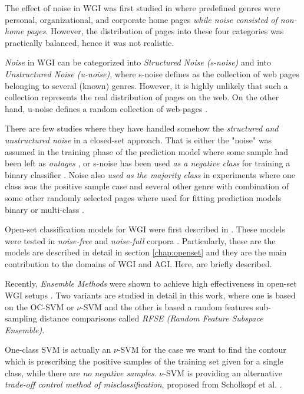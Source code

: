 The effect of noise in WGI  was first studied in \cite{shepherd2004cybergenre,kennedy2005automatic,dong2006binary,levering2008using} where predefined genres were personal, organizational, and corporate home pages \textit{while noise consisted of non-home pages}. However, the distribution of pages into these four categories was practically balanced, hence it was not realistic.

\textit{Noise} in WGI can be categorized into \textit{Structured Noise (s-noise)} and into \textit{Unstructured Noise (u-noise)}, where s-noise defines as the collection of web pages belonging to several (known) genres. However, it is highly unlikely that such a collection  represents the real distribution of pages on the web. On the other hand, u-noise defines a random collection of web-pages \parencite{santini2011cross}.

There are few studies where they have handled somehow the \textit{structured and unstructured noise} in a closed-set approach. That is either the "noise" was assumed in the training phase of the prediction model where some sample had been left as \textit{outages} \parencite{jebari2015combination}, or s-noise has been used \textit{as a negative class} for training a binary classifier \parencite{Vidulin2007}. Noise also\textit{ used as the majority class} in experiments where one class was the positive sample case and several other genre with combination of some other randomly selected pages where used for fitting prediction models binary or multi-class \parencite{dong2006binary,levering2008using}. 

Open-set classification models for WGI were first described in \cite{pritsos2013open,stubbe2007genre}. These models were tested in \textit{noise-free} and \textit{noise-full} corpora \cite{pritsos2015clef,pritsos2018open,pritsos2019open}. Particularly, these are the models are described in detail in section \ref{chap:openset} and they are the main contribution to the domains of WGI and AGI. Here, are briefly described.

Recently, \textit{Ensemble Methods} were shown to achieve high effectiveness in open-set WGI setups \cite{pritsos2013open,pritsos2015clef,pritsos2018open,pritsos2019open}. Two variants are studied in detail in this work, where one is based on the OC-SVM or $\nu$-SVM and the other is based a random features sub-sampling distance comparisons called \textit{RFSE (Random Feature Subspace Ensemble)}. 

One-class SVM is actually an $\nu$-SVM for the case we want to find the contour which is prescribing the positive samples of the training set given for a single class, while there are \textit{no negative samples}. $\nu$-SVM is providing an alternative \textit{trade-off control method of misclassification}, proposed from Scholkopf et al. \citep{scholkopf1999estimating}. 

